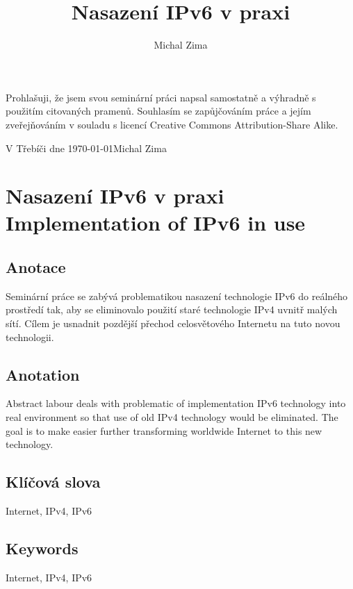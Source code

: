 \documentclass[12pt]{report}
\title{Nasazení IPv6 v praxi}
\author{Michal Zima}
\date{}
\begin{document}
\maketitle
\setcounter{page}{2}	%


\thispagestyle{empty}
Prohlašuji, že jsem svou seminární práci napsal samostatně a výhradně s použitím citovaných pramenů. Souhlasím se zapůjčováním práce a jejím zveřejňováním v souladu s licencí Creative Commons Attribution-Share Alike.

\bigskip	%
\noindent V Třebíči dne \today \hspace{\fill}Michal Zima
\newpage{}


\thispagestyle{plain}
\section*{Nasazení IPv6 v praxi\\Implementation of IPv6 in use}
\subsection*{Anotace}
Seminární práce se zabývá problematikou nasazení technologie IPv6 do reálného prostředí tak, aby se eliminovalo použití staré technologie IPv4 uvnitř malých sítí. Cílem je usnadnit pozdější přechod celosvětového Internetu na tuto novou technologii.
\subsection*{Anotation}
Abstract labour deals with problematic of implementation IPv6 technology into real environment so that use of old IPv4 technology would be eliminated. The goal is to make easier further transforming worldwide Internet to this new technology.
\subsection*{Klíčová slova}
Internet, IPv4, IPv6
\subsection*{Keywords}
Internet, IPv4, IPv6
\newpage{}

\end{document}
